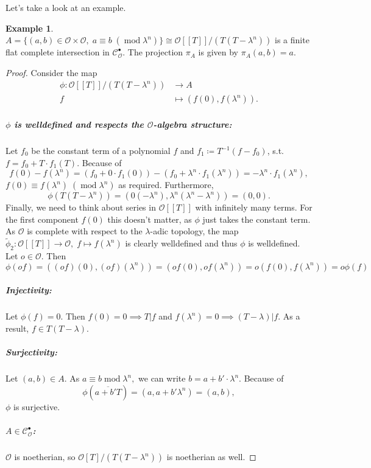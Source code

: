 \documentclass{article}
\theoremstyle{plain}%
\theoremstyle{definition}
\newtheorem{example}{Example}[section]
\theoremstyle{remark}
\newcommand{\cob}{\mathcal{C}_\mathcal{O}^\bullet}
\begin{document}
Let's take a look at an example.
\begin{example}\label{ex:first_1}\cite[cf.][example 1]{darmon1995fermat}
    \(A = \{(a,b) \in \mathcal{O}\times\mathcal{O},\; a \equiv b\; (\operatorname{mod} \lambda^n)\} 
    \cong \mathcal{O}[[T]]/(T(T-\lambda^n))\) is a finite flat complete intersection in \(\cob\).
    The projection \(\pi_A\) is given by \(\pi_A(a,b) = a\).
    \begin{proof}
        Consider the map
        \begin{align*}
            \phi\colon \mathcal{O}[[T]]/(T(T-\lambda^n)) &\to A\\
            f &\mapsto (f(0), f(\lambda^n)).
        \end{align*}
        \subparagraph*{\(\phi\) is welldefined and respects the \(\mathcal{O}\)-algebra structure:}
        Let \(f_0\) be the constant term of a polynomial \(f\) and \(f_1 \coloneqq T^{-1}(f-f_0)\), 
        s.t. \(f = f_0 + T\cdot f_1(T)\). Because of
        \[
            f(0) - f(\lambda^n) 
            = (f_0 + 0\cdot f_1(0)) - (f_0 + \lambda^n \cdot f_1(\lambda^n)) 
            = -\lambda^n \cdot f_1(\lambda^n),
        \]
        \(f(0) \equiv f(\lambda^n)\; (\operatorname{mod} \lambda^n)\) as required.
        Furthermore, \[\phi(T(T-\lambda^n)) = (0(-\lambda^n), \lambda^n(\lambda^n - \lambda^n)) = (0,0).\]
        Finally, we need to think about series in \(\mathcal{O}[[T]]\) with infinitely many terms.
        For the first component \(f(0)\) this doesn't matter, as \(\phi\) just takes the constant term. 
        As \(\mathcal{O}\) is complete with respect to the \(\lambda\)-adic topology, 
        the map \(\tilde\phi_2\colon \mathcal{O}[[T]] \to \mathcal{O},\; f \mapsto f(\lambda^n)\) 
        is clearly welldefined and thus \(\phi\) is welldefined.
        Let \(o \in \mathcal{O}\). Then 
        \[\phi(of) = ((of)(0),(of)(\lambda^n)) = (of(0), of(\lambda^n)) = o(f(0), f(\lambda^n)) = o\phi(f)\]
        \subparagraph*{Injectivity:}
        Let \(\phi(f) = 0\). Then \(f(0) = 0 \implies T | f\) and \(f(\lambda^n) = 0 \implies (T - \lambda) | f\).
        As a result, \(f \in T(T-\lambda)\).
        \subparagraph{Surjectivity:}
        Let \((a,b) \in A\).
        As \(a \equiv b \operatorname{mod} \lambda^n,\) we can write \(b = a + b' \cdot \lambda^n\). Because of
        \[\phi(\overline{a + b'T}) = (a, a + b' \lambda^n) = (a,b),\] \(\phi\) is surjective.
        \subparagraph*{\(A\in \cob\):}
        \(\mathcal{O}\) is noetherian, so \(\mathcal{O}[T]/(T(T-\lambda^n))\) is noetherian as well.

\end{proof}
\end{example}
\end{document}
